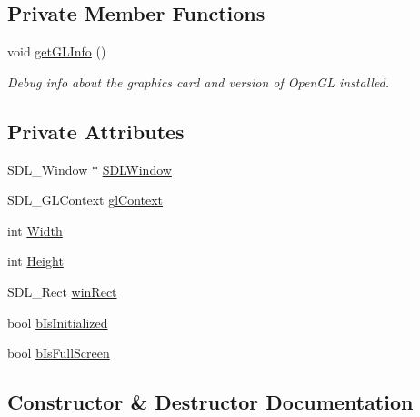 \subsection*{Private Member Functions}
\begin{DoxyCompactItemize}
\item 
void \hyperlink{class_ori_engine_1_1_window_a8e80d9499f2968b20492b517006cc1b3}{get\+G\+L\+Info} ()
\begin{DoxyCompactList}\small\item\em Debug info about the graphics card and version of Open\+GL installed. \end{DoxyCompactList}\end{DoxyCompactItemize}
\subsection*{Private Attributes}
\begin{DoxyCompactItemize}
\item 
S\+D\+L\+\_\+\+Window $\ast$ \hyperlink{class_ori_engine_1_1_window_ab89e66fc9f835484f073a7ac7c1ee546}{S\+D\+L\+Window}
\item 
S\+D\+L\+\_\+\+G\+L\+Context \hyperlink{class_ori_engine_1_1_window_a1e0582658a858b0cfa732c990a8573c0}{gl\+Context}
\item 
int \hyperlink{class_ori_engine_1_1_window_a3f618d387c7429ade0b51f3c76c1ebb6}{Width}
\item 
int \hyperlink{class_ori_engine_1_1_window_a2315cbe759b91f12618a81f47b1f4c32}{Height}
\item 
S\+D\+L\+\_\+\+Rect \hyperlink{class_ori_engine_1_1_window_a1e2e93b43d6b1ca022ad8393db7ac35f}{win\+Rect}
\item 
bool \hyperlink{class_ori_engine_1_1_window_a9a2f58afdd7d2cdd920f7c733b4b7dd6}{b\+Is\+Initialized}
\item 
bool \hyperlink{class_ori_engine_1_1_window_a31ccebb8ecb24ead816ae2559e1e36d2}{b\+Is\+Full\+Screen}
\end{DoxyCompactItemize}


\subsection{Constructor \& Destructor Documentation}
\hypertarget{class_ori_engine_1_1_window_a74e6087da23d3c24e9fac0245e5ec92c}{}\label{class_ori_engine_1_1_window_a74e6087da23d3c24e9fac0245e5ec92c} 
